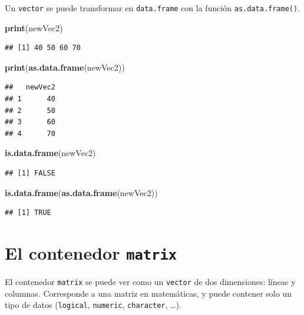\documentclass[
]{book}
\newenvironment{Shaded}{\begin{snugshade}}{\end{snugshade}}
\newcommand{\KeywordTok}[1]{\textcolor[rgb]{0.13,0.29,0.53}{\textbf{#1}}}
\newcommand{\NormalTok}[1]{#1}
\begin{document}
Un \texttt{vector} se puede transformar en \texttt{data.frame} con la función \texttt{as.data.frame()}.

\begin{Shaded}
\begin{Highlighting}[]
\KeywordTok{print}\NormalTok{(newVec2)}
\end{Highlighting}
\end{Shaded}

\begin{verbatim}
## [1] 40 50 60 70
\end{verbatim}

\begin{Shaded}
\begin{Highlighting}[]
\KeywordTok{print}\NormalTok{(}\KeywordTok{as.data.frame}\NormalTok{(newVec2))}
\end{Highlighting}
\end{Shaded}

\begin{verbatim}
##   newVec2
## 1      40
## 2      50
## 3      60
## 4      70
\end{verbatim}

\begin{Shaded}
\begin{Highlighting}[]
\KeywordTok{is.data.frame}\NormalTok{(newVec2)}
\end{Highlighting}
\end{Shaded}

\begin{verbatim}
## [1] FALSE
\end{verbatim}

\begin{Shaded}
\begin{Highlighting}[]
\KeywordTok{is.data.frame}\NormalTok{(}\KeywordTok{as.data.frame}\NormalTok{(newVec2))}
\end{Highlighting}
\end{Shaded}

\begin{verbatim}
## [1] TRUE
\end{verbatim}

\hypertarget{l014matrix}{%
\section{\texorpdfstring{El contenedor \texttt{matrix}}{El contenedor matrix}}\label{l014matrix}}

El contenedor \texttt{matrix} se puede ver como un \texttt{vector} de dos dimensiones: líneas y columnas. Corresponde a una matriz en matemáticas, y puede contener solo un tipo de datos (\texttt{logical}, \texttt{numeric}, \texttt{character}, \ldots).
\end{document}

